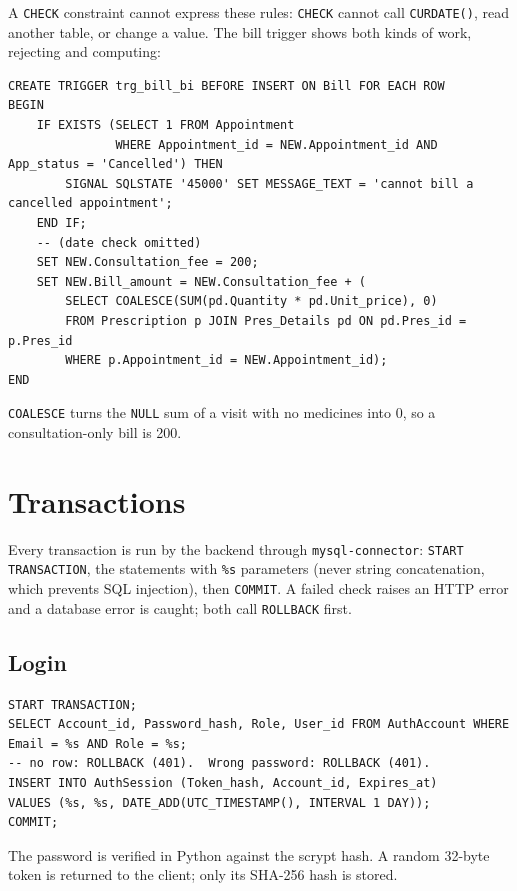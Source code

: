 \documentclass[11pt,a4paper]{article}
\newcommand{\code}[1]{\texttt{#1}}
\begin{document}
A \code{CHECK} constraint cannot express these rules: \code{CHECK} cannot call \code{CURDATE()}, read another table, or change a value. The bill trigger shows both kinds of work, rejecting and computing:

\begin{lstlisting}[style=sql]
CREATE TRIGGER trg_bill_bi BEFORE INSERT ON Bill FOR EACH ROW
BEGIN
    IF EXISTS (SELECT 1 FROM Appointment
               WHERE Appointment_id = NEW.Appointment_id AND App_status = 'Cancelled') THEN
        SIGNAL SQLSTATE '45000' SET MESSAGE_TEXT = 'cannot bill a cancelled appointment';
    END IF;
    -- (date check omitted)
    SET NEW.Consultation_fee = 200;
    SET NEW.Bill_amount = NEW.Consultation_fee + (
        SELECT COALESCE(SUM(pd.Quantity * pd.Unit_price), 0)
        FROM Prescription p JOIN Pres_Details pd ON pd.Pres_id = p.Pres_id
        WHERE p.Appointment_id = NEW.Appointment_id);
END
\end{lstlisting}

\code{COALESCE} turns the \code{NULL} sum of a visit with no medicines into 0, so a consultation-only bill is 200.

\section{Transactions}

Every transaction is run by the backend through \code{mysql-connector}: \code{START TRANSACTION}, the statements with \code{\%s} parameters (never string concatenation, which prevents SQL injection), then \code{COMMIT}. A failed check raises an HTTP error and a database error is caught; both call \code{ROLLBACK} first.

\subsection{Login}
\begin{lstlisting}[style=sql]
START TRANSACTION;
SELECT Account_id, Password_hash, Role, User_id FROM AuthAccount WHERE Email = %s AND Role = %s;
-- no row: ROLLBACK (401).  Wrong password: ROLLBACK (401).
INSERT INTO AuthSession (Token_hash, Account_id, Expires_at)
VALUES (%s, %s, DATE_ADD(UTC_TIMESTAMP(), INTERVAL 1 DAY));
COMMIT;
\end{lstlisting}
The password is verified in Python against the scrypt hash. A random 32-byte token is returned to the client; only its SHA-256 hash is stored.
\end{document}
